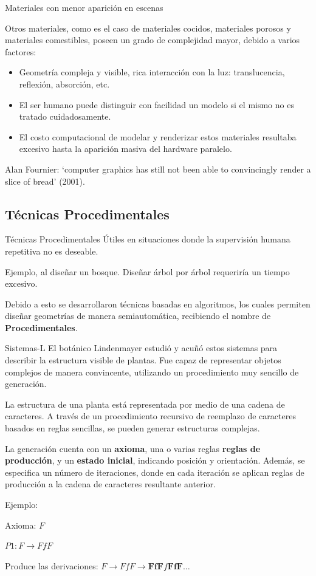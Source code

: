 \documentclass[spanish]{beamer}
\begin{document}
\begin{frame}{Materiales con menor aparición en escenas}

Otros materiales, como es el caso de materiales cocidos, materiales porosos y materiales comestibles, poseen un grado de complejidad mayor, debido a varios factores:

\begin{itemize}
\item Geometría compleja y visible, rica interacción con la luz: translucencia, reflexión, absorción, etc.
\item El ser humano puede distinguir con facilidad un modelo si el mismo no es tratado cuidadosamente.
\item El costo computacional de modelar y renderizar estos materiales resultaba excesivo hasta la aparición masiva del hardware paralelo.
\end{itemize}

Alan Fournier: `computer graphics has still not been
able to convincingly render a slice of bread' (2001). 


\end{frame}

\subsection{Técnicas Procedimentales}
\begin{frame}{Técnicas Procedimentales}
Útiles en situaciones donde la supervisión humana repetitiva no es deseable.

Ejemplo, al diseñar un bosque. Diseñar árbol por árbol requeriría un tiempo excesivo.

Debido a esto se desarrollaron técnicas basadas en algoritmos, los cuales permiten diseñar geometrías de manera semiautomática, recibiendo el nombre de \textbf{Procedimentales}.

\end{frame}

\begin{frame}{Sistemas-L}
El botánico Lindenmayer estudió y acuñó estos sistemas para describir la estructura visible de plantas. Fue capaz de representar objetos complejos de manera convincente, utilizando un procedimiento muy sencillo de generación.

La estructura de una planta está representada por medio de una cadena de caracteres.
A través de un procedimiento recursivo de reemplazo de caracteres basados en reglas sencillas, se pueden generar estructuras complejas.

La generación cuenta con un \textbf{axioma}, una o varias reglas \textbf{reglas de producción}, y un \textbf{estado inicial}, indicando posición y orientación.
Además, se especifica un número de iteraciones, donde en cada iteración se aplican reglas de producción a la cadena de caracteres resultante anterior.

Ejemplo:

Axioma: $F$

$P1: F \rightarrow FfF$

Produce las derivaciones:
$F \rightarrow FfF \rightarrow \textbf{FfF}f\textbf{FfF} \ldots$

\end{frame}
\end{document}
